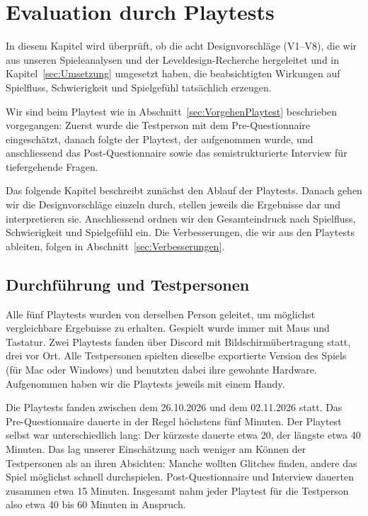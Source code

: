 \documentclass[../Main.tex]{subfiles}
\begin{document}
\section{Evaluation durch Playtests} \label{sec:Evaluation}

In diesem Kapitel wird überprüft, ob die acht Designvorschläge (V1--V8), die wir aus unseren Spieleanalysen und der Leveldesign-Recherche hergeleitet und in Kapitel~\ref{sec:Umsetzung} umgesetzt haben, die beabsichtigten Wirkungen auf Spielfluss, Schwierigkeit und Spielgefühl tatsächlich erzeugen.

Wir sind beim Playtest wie in Abschnitt~\ref{sec:VorgehenPlaytest} beschrieben vorgegangen: Zuerst wurde die Testperson mit dem Pre-Questionnaire eingeschätzt, danach folgte der Playtest, der aufgenommen wurde, und anschliessend das Post-Questionnaire sowie das semistrukturierte Interview für tiefergehende Fragen.

Das folgende Kapitel beschreibt zunächst den Ablauf der Playtests. Danach gehen wir die Designvorschläge einzeln durch, stellen jeweils die Ergebnisse dar und interpretieren sie. Anschliessend ordnen wir den Gesamteindruck nach Spielfluss, Schwierigkeit und Spielgefühl ein. Die Verbesserungen, die wir aus den Playtests ableiten, folgen in Abschnitt~\ref{sec:Verbesserungen}.

\subsection{Durchführung und Testpersonen} \label{sec:Durchfuehrung}

Alle fünf Playtests wurden von derselben Person geleitet, um möglichst vergleichbare Ergebnisse zu erhalten. Gespielt wurde immer mit Maus und Tastatur. Zwei Playtests fanden über Discord mit Bildschirmübertragung statt, drei vor Ort. Alle Testpersonen spielten dieselbe exportierte Version des Spiels (für Mac oder Windows) und benutzten dabei ihre gewohnte Hardware. Aufgenommen haben wir die Playtests jeweils mit einem Handy.

Die Playtests fanden zwischen dem 26.10.2026 und dem 02.11.2026 statt. Das Pre-Questionnaire dauerte in der Regel höchstens fünf Minuten. Der Playtest selbst war unterschiedlich lang: Der kürzeste dauerte etwa 20, der längste etwa 40 Minuten. Das lag unserer Einschätzung nach weniger am Können der Testpersonen als an ihren Absichten: Manche wollten Glitches finden, andere das Spiel möglichst schnell durchspielen. Post-Questionnaire und Interview dauerten zusammen etwa 15 Minuten. Insgesamt nahm jeder Playtest für die Testperson also etwa 40 bis 60 Minuten in Anspruch.
\end{document}
